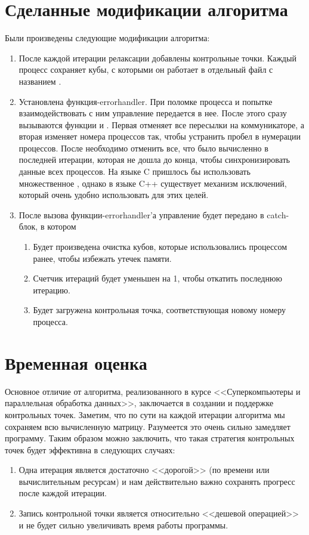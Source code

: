 \section{Сделанные модификации алгоритма}
Были произведены следующие модификации алгоритма:
\begin{enumerate}
    \item После каждой итерации релаксации добавлены контрольные точки. Каждый
        процесс сохраняет кубы, с которыми он работает в отдельный файл
        с названием .
    \item Установлена функция-errorhandler. При поломке процесса и попытке
        взаимодействовать с ним управление передается в нее. После этого сразу
        вызываются функции  и .
        Первая отменяет все пересылки на коммуникаторе, а вторая изменяет
        номера процессов так, чтобы устранить пробел в нумерации процессов.
        После необходимо отменить все, что было вычисленно в последней итерации,
        которая не дошла до конца, чтобы синхронизировать данные всех процессов.
        На языке C пришлось бы использовать множественное , однако
        в языке C++ существует механизм исключений, который очень удобно использовать
        для этих целей.
    \item После вызова функции-errorhandler'а управление будет передано в
        catch-блок, в котором
        \begin{enumerate}
            \item Будет произведена очистка кубов, которые использовались
                процессом ранее, чтобы избежать утечек памяти.
            \item Счетчик итераций будет уменьшен на 1, чтобы откатить
                последнюю итерацию.
            \item Будет загружена контрольная точка, соответствующая новому
                номеру процесса.
        \end{enumerate}
\end{enumerate}

\section{Временная оценка}
Основное отличие от алгоритма, реализованного в курсе <<Суперкомпьютеры и
параллельная обработка данных>>, заключается в создании и поддержке контрольных
точек. Заметим, что по сути на каждой итерации алгоритма мы сохраняем всю
вычисленную матрицу. Разумеется это очень сильно замедляет программу. Таким
образом можно заключить, что такая стратегия контрольных точек будет эффективна
в следующих случаях:
\begin{enumerate}
    \item Одна итерация является достаточно <<дорогой>> (по времени или
        вычислительным ресурсам) и нам действительно важно сохранять прогресс
        после каждой итерации.
    \item Запись контрольной точки является относительно <<дешевой операцией>>
        и не будет сильно увеличивать время работы программы.
\end{enumerate}

